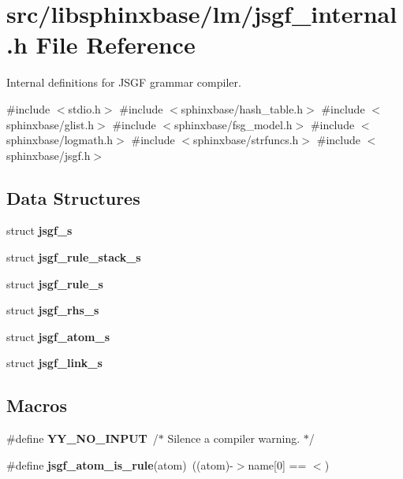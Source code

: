 \section{src/libsphinxbase/lm/jsgf\+\_\+internal.h File Reference}
\label{jsgf__internal_8h}


Internal definitions for J\+S\+GF grammar compiler.  


{\ttfamily \#include $<$stdio.\+h$>$}\newline
{\ttfamily \#include $<$sphinxbase/hash\+\_\+table.\+h$>$}\newline
{\ttfamily \#include $<$sphinxbase/glist.\+h$>$}\newline
{\ttfamily \#include $<$sphinxbase/fsg\+\_\+model.\+h$>$}\newline
{\ttfamily \#include $<$sphinxbase/logmath.\+h$>$}\newline
{\ttfamily \#include $<$sphinxbase/strfuncs.\+h$>$}\newline
{\ttfamily \#include $<$sphinxbase/jsgf.\+h$>$}\newline
\subsection*{Data Structures}
\begin{DoxyCompactItemize}
\item 
struct \textbf{ jsgf\+\_\+s}
\item 
struct \textbf{ jsgf\+\_\+rule\+\_\+stack\+\_\+s}
\item 
struct \textbf{ jsgf\+\_\+rule\+\_\+s}
\item 
struct \textbf{ jsgf\+\_\+rhs\+\_\+s}
\item 
struct \textbf{ jsgf\+\_\+atom\+\_\+s}
\item 
struct \textbf{ jsgf\+\_\+link\+\_\+s}
\end{DoxyCompactItemize}
\subsection*{Macros}
\begin{DoxyCompactItemize}
\item 
\mbox{\label{jsgf__internal_8h_a85523a0c7d95c059d251b4e9829947aa}} 
\#define {\bfseries Y\+Y\+\_\+\+N\+O\+\_\+\+I\+N\+P\+UT}~/$\ast$ Silence a compiler warning. $\ast$/
\item 
\mbox{\label{jsgf__internal_8h_ac4452bbb59863e64d73f4fe2d6cd394f}} 
\#define {\bfseries jsgf\+\_\+atom\+\_\+is\+\_\+rule}(atom)~((atom)-\/$>$name[0] == \textquotesingle{}$<$\textquotesingle{})
\end{DoxyCompactItemize}
